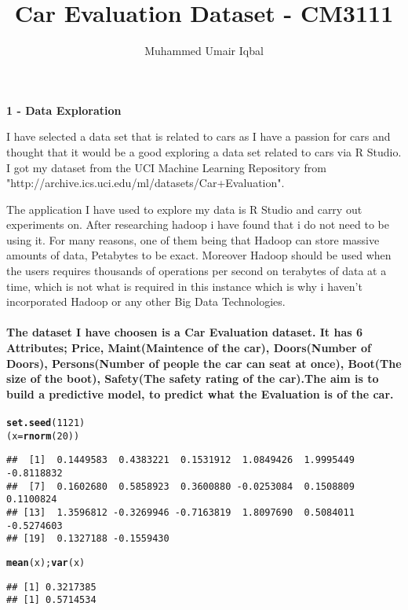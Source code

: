 \documentclass{article}\usepackage[]{graphicx}\usepackage[]{color}
\makeatletter
\newcommand{\hlnum}[1]{\textcolor[rgb]{0.686,0.059,0.569}{#1}}%
\newcommand{\hlstd}[1]{\textcolor[rgb]{0.345,0.345,0.345}{#1}}%
\newcommand{\hlkwb}[1]{\textcolor[rgb]{0.69,0.353,0.396}{#1}}%
\newcommand{\hlkwd}[1]{\textcolor[rgb]{0.737,0.353,0.396}{\textbf{#1}}}%
\newenvironment{kframe}{%
 \def\at@end@of@kframe{}%
 \ifinner\ifhmode%
  \def\at@end@of@kframe{\end{minipage}}%
  \begin{minipage}{\columnwidth}%
 \fi\fi%
 \def\FrameCommand##1{\hskip\@totalleftmargin \hskip-\fboxsep
 \colorbox{shadecolor}{##1}\hskip-\fboxsep
     \hskip-\linewidth \hskip-\@totalleftmargin \hskip\columnwidth}%
 \MakeFramed {\advance\hsize-\width
   \@totalleftmargin\z@ \linewidth\hsize
   \@setminipage}}%
 {\par\unskip\endMakeFramed%
 \at@end@of@kframe}
\newenvironment{knitrout}{}{} %
\makeatother
\begin{document}
\title{Car Evaluation Dataset - CM3111}

\author{Muhammed Umair Iqbal}

\maketitle

\textbf{1 - Data Exploration}



  I have selected a data set that is related to cars as I have a passion for cars and thought that it would be a good exploring a data set related to cars via R Studio. I got my dataset from the UCI Machine Learning Repository from "http://archive.ics.uci.edu/ml/datasets/Car+Evaluation".



  The application I have used to explore my data is R Studio and carry out experiments on. After researching hadoop i have found that i do not need to be using it. For many reasons, one of them being that Hadoop can store massive amounts of data, Petabytes to be exact. Moreover Hadoop should be used when the users requires thousands of operations per second on terabytes of data at a time, which is not what is required in this instance which is why i haven't incorporated Hadoop or any other Big Data Technologies.


\paragraph{The dataset I have choosen is a Car Evaluation dataset. It has 6 Attributes; Price, Maint(Maintence of the car), Doors(Number of Doors), Persons(Number of people the car can seat at once), Boot(The size of the boot), Safety(The safety rating of the car).The aim is to build a predictive model, to predict what the Evaluation is of the car.}






\begin{knitrout}
\color{fgcolor}\begin{kframe}
\begin{alltt}
\hlkwd{set.seed}\hlstd{(}\hlnum{1121}\hlstd{)}
\hlstd{(x}\hlkwb{=}\hlkwd{rnorm}\hlstd{(}\hlnum{20}\hlstd{))}
\end{alltt}
\begin{verbatim}
##  [1]  0.1449583  0.4383221  0.1531912  1.0849426  1.9995449 -0.8118832
##  [7]  0.1602680  0.5858923  0.3600880 -0.0253084  0.1508809  0.1100824
## [13]  1.3596812 -0.3269946 -0.7163819  1.8097690  0.5084011 -0.5274603
## [19]  0.1327188 -0.1559430
\end{verbatim}
\begin{alltt}
\hlkwd{mean}\hlstd{(x);}\hlkwd{var}\hlstd{(x)}
\end{alltt}
\begin{verbatim}
## [1] 0.3217385
## [1] 0.5714534
\end{verbatim}
\end{kframe}
\end{knitrout}
\end{document}
